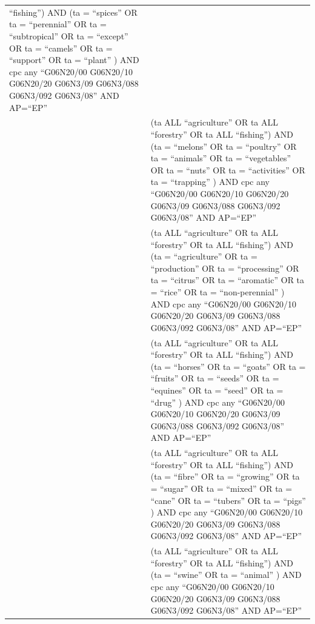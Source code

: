 \documentclass[
  12pt,
  a4paperpaper,
]{article}
\begin{document}
\begin{longtable}[]{@{}
  >{\raggedleft\arraybackslash}p{}
  >{\raggedright\arraybackslash}p{}@{}}
``fishing'') AND (ta = ``spices'' OR ta = ``perennial'' OR ta =
``subtropical'' OR ta = ``except'' OR ta = ``camels'' OR ta =
``support'' OR ta = ``plant'' ) AND cpc any ``G06N20/00 G06N20/10
G06N20/20 G06N3/09 G06N3/088 G06N3/092 G06N3/08'' AND AP=``EP'' \\
5 & (ta ALL ``agriculture'' OR ta ALL ``forestry'' OR ta ALL
``fishing'') AND (ta = ``melons'' OR ta = ``poultry'' OR ta =
``animals'' OR ta = ``vegetables'' OR ta = ``nuts'' OR ta =
``activities'' OR ta = ``trapping'' ) AND cpc any ``G06N20/00 G06N20/10
G06N20/20 G06N3/09 G06N3/088 G06N3/092 G06N3/08'' AND AP=``EP'' \\
6 & (ta ALL ``agriculture'' OR ta ALL ``forestry'' OR ta ALL
``fishing'') AND (ta = ``agriculture'' OR ta = ``production'' OR ta =
``processing'' OR ta = ``citrus'' OR ta = ``aromatic'' OR ta = ``rice''
OR ta = ``non-perennial'' ) AND cpc any ``G06N20/00 G06N20/10 G06N20/20
G06N3/09 G06N3/088 G06N3/092 G06N3/08'' AND AP=``EP'' \\
7 & (ta ALL ``agriculture'' OR ta ALL ``forestry'' OR ta ALL
``fishing'') AND (ta = ``horses'' OR ta = ``goats'' OR ta = ``fruits''
OR ta = ``seeds'' OR ta = ``equines'' OR ta = ``seed'' OR ta = ``drug''
) AND cpc any ``G06N20/00 G06N20/10 G06N20/20 G06N3/09 G06N3/088
G06N3/092 G06N3/08'' AND AP=``EP'' \\
8 & (ta ALL ``agriculture'' OR ta ALL ``forestry'' OR ta ALL
``fishing'') AND (ta = ``fibre'' OR ta = ``growing'' OR ta = ``sugar''
OR ta = ``mixed'' OR ta = ``cane'' OR ta = ``tubers'' OR ta = ``pigs'' )
AND cpc any ``G06N20/00 G06N20/10 G06N20/20 G06N3/09 G06N3/088 G06N3/092
G06N3/08'' AND AP=``EP'' \\
9 & (ta ALL ``agriculture'' OR ta ALL ``forestry'' OR ta ALL
``fishing'') AND (ta = ``swine'' OR ta = ``animal'' ) AND cpc any
``G06N20/00 G06N20/10 G06N20/20 G06N3/09 G06N3/088 G06N3/092 G06N3/08''
AND AP=``EP'' \\
\end{longtable}

\newpage{}
\end{document}
